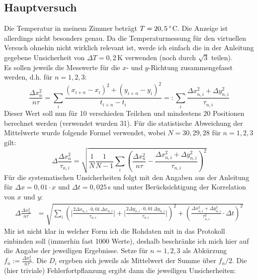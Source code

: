 \documentclass[a4paper,12pt]{article}
\newcommand{\kla}{}
\begin{document}
\subsection{Hauptversuch}
Die Temperatur in meinem Zimmer beträgt $T=20,5\,\degree$C. Die Anzeige ist allerdings nicht besonders genau. Da die Temperaturmessung für den virtuellen Versuch ohnehin nicht wirklich relevant ist, werde ich einfach die in der Anleitung gegebene Unsicherheit von $\Delta T=0,2\,$K verwenden (noch durch $\sqrt{3}$ teilen). \\
Es sollen jeweils die Messwerte für die $x$- und $y$-Richtung zusammengefasst werden, d.h. für $n=1,2,3$:
$$\frac{\Delta x_{n}^2}{n\tau}=\sum_i \frac{(x_{i+n}-x_i)^2+(y_{i+n}-y_i)^2}{t_{i+n}-t_i}=:\sum_i\frac{\Delta x_{n,i}^2+\Delta y_{n,i}^2}{\tau_{n,i}}$$
Dieser Wert soll nun für 10 verschieden Teilchen und mindestens 20 Positionen berechnet werden (verwendet wurden 31). Für die statistische Abweichung der Mittelwerte wurde folgende Formel verwendet, wobei $N=30, 29, 28$ für $n=1,2,3$ gilt:
$$\Delta\frac{\Delta x_n^2}{\tau_{n,i}}=\sqrt{\frac{1}{N}\frac{1}{N-1}\sum_i\kla\left( {\frac{\Delta x_n^2}{n\tau}-\frac{\Delta x_{n,i}^2+\Delta y_{n,i}^2}{\tau_{n,i}}} \right)^2}$$
Für die systematischen Unsicherheiten folgt mit den Angaben aus der Anleitung für $\Delta x=0,01\cdot x$ und $\Delta t=0,025\,$s und unter Berücksichtigung der Korrelation von $x$ und $y$:
\begin{align*}
\Delta\frac{\Delta x_n^2}{n\tau}&=\sqrt{\sum_i\kla\left(\bigg\vert  {\frac{2\Delta x_{n,i}\cdot 0,01\,\Delta x_{n,i}}{\tau_{n,i}}\bigg\vert +\bigg\vert}\frac{2\Delta y_{n,i}\cdot 0,01\,\Delta y_{n,i}}{\tau_{n,i}}\bigg\vert \right)^2+\kla\left( {\frac{\Delta x_{n,i}^2+\Delta y_{n,i}^2}{\tau_{n,i}^2}\cdot\Delta t} \right)^2}
\end{align*}
Mir ist nicht klar in welcher Form ich die Rohdaten mit in das Protokoll einbinden soll (immerhin fast 1000 Werte), deshalb beschränke ich mich hier auf die Angabe der jeweiligen Ergebnisse. Setze für $n=1,2,3$ als Abkürzung $f_n:=\frac{\Delta x_n^2}{n\tau}$. Die $D_i$ ergeben sich jeweils als Mittelwert der Summe über $f_n/2$. Die (hier triviale) Fehlerfortpflanzung ergibt dann die jeweiligen Unsicherheiten:
\end{document}
